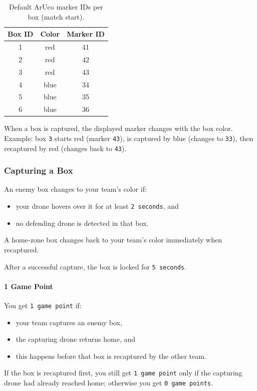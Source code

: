 \begin{table}[H]
\centering
\begin{tabular}{ccc}
\hline
\textbf{Box ID} & \textbf{Color} & \textbf{Marker ID} \\
\hline
1 & red  & 41 \\
2 & red  & 42 \\
3 & red  & 43 \\
4 & blue & 34 \\
5 & blue & 35 \\
6 & blue & 36 \\
\hline
\end{tabular}
\caption{Default ArUco marker IDs per box (match start).}
\label{tab:aruco-ids}
\end{table}

When a box is captured, the displayed marker changes with the box color. Example: box \texttt{3} starts red (marker \texttt{43}), is captured by blue (changes to \texttt{33}), then recaptured by red (changes back to \texttt{43}).

\subsubsection{Capturing a Box}
An enemy box changes to your team's color if:
\begin{itemize}
	\item{your drone hovers over it for at least \texttt{2 seconds}, and}
	\item{no defending drone is detected in that box.}
\end{itemize}

A home-zone box changes back to your team's color immediately when recaptured.

After a successful capture, the box is locked for \texttt{5 seconds}.

\paragraph{1 Game Point}
You get \texttt{1 game point} if:
\begin{itemize}
	\item{your team captures an enemy box,}
	\item{the capturing drone returns home, and}
	\item{this happens before that box is recaptured by the other team.}
\end{itemize}

If the box is recaptured first, you still get \texttt{1 game point} only if the capturing drone had already reached home; otherwise you get \texttt{0 game points}.

